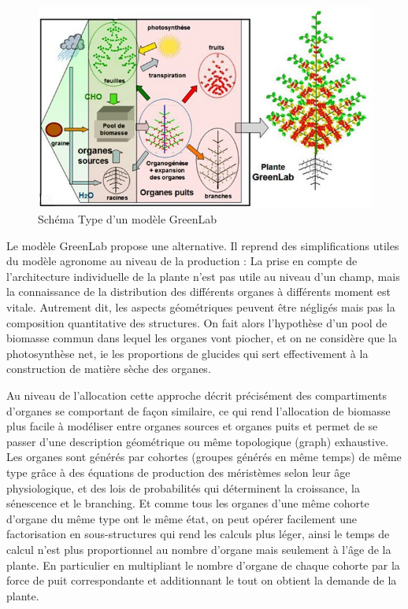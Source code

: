 {\begin{figure}[h]
\begin{center}
	
  \includegraphics[scale=1.0]{./img/sGL.jpg}
  \caption{Schéma Type d'un modèle GreenLab}
  \label{fig:schémaGL}
  
  \end{center}
\end{figure}


Le modèle GreenLab propose une alternative. Il reprend des simplifications utiles du modèle agronome au niveau de la production : La prise en compte de l’architecture individuelle de la plante n’est pas utile au niveau d’un champ, mais la connaissance de la distribution des différents organes à différents moment est vitale. Autrement dit, les aspects géométriques peuvent être négligés mais pas la composition quantitative des structures. On fait alors l’hypothèse d’un pool de biomasse commun dans lequel les organes vont piocher, et on ne considère que la photosynthèse net, ie les proportions de glucides qui sert effectivement à la construction de matière sèche des organes. 

Au niveau de l’allocation cette approche décrit précisément des compartiments d’organes se comportant de façon similaire, ce qui rend l’allocation de biomasse plus facile à modéliser entre organes sources et organes puits et permet de se passer d’une description géométrique ou même topologique (graph) exhaustive. Les organes sont générés par cohortes (groupes générés en même temps) de même type grâce à des équations de production des méristèmes selon leur âge physiologique, et des lois de probabilités qui déterminent la croissance, la sénescence et le branching. Et comme tous les organes d’une même cohorte d’organe du même type ont le même état, on peut opérer facilement une factorisation en sous-structures qui rend les calculs plus léger, ainsi le temps de calcul n’est plus proportionnel au nombre d’organe mais seulement à l’âge de la plante. En particulier en multipliant le nombre d’organe de chaque cohorte par la force de puit correspondante et additionnant le tout on obtient la demande de la plante.

}
